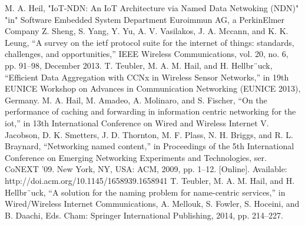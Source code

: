 \documentclass[conference]{IEEEtran}
\begin{document}
  \begin{thebibliography}{00}
  M. A. Heil, "IoT-NDN: An IoT Architecture via Named Data
  Netwoking (NDN)" "in" Software Embedded System Department
  Euroimmun AG, a PerkinElmer Company
   Z. Sheng, S. Yang, Y. Yu, A. V. Vasilakos, J. A. Mccann, and K. K.
  Leung, “A survey on the ietf protocol suite for the internet of things:
  standards, challenges, and opportunities,” IEEE Wireless Communications,
  vol. 20, no. 6, pp. 91–98, December 2013.
   T. Teubler, M. A. M. Hail, and H. Hellbr¨uck, “Efficient Data Aggregation
  with CCNx in Wireless Sensor Networks,” in 19th EUNICE Workshop
  on Advances in Communication Networking (EUNICE 2013), Germany.
  M. A. Hail, M. Amadeo, A. Molinaro, and S. Fischer, “On the performance
  of caching and forwarding in information centric networking for
  the iot,” in 13th International Conference on Wired and Wireless Internet
  V. Jacobson, D. K. Smetters, J. D. Thornton, M. F. Plass, N. H. Briggs,
  and R. L. Braynard, “Networking named content,” in Proceedings of the
  5th International Conference on Emerging Networking Experiments and
  Technologies, ser. CoNEXT ’09. New York, NY, USA: ACM, 2009, pp.
  1–12. [Online]. Available: http://doi.acm.org/10.1145/1658939.1658941
  T. Teubler, M. A. M. Hail, and H. Hellbr¨uck, “A solution for the
  naming problem for name-centric services,” in Wired/Wireless Internet
  Communications, A. Mellouk, S. Fowler, S. Hoceini, and B. Daachi,
  Eds. Cham: Springer International Publishing, 2014, pp. 214–227.
  \end{thebibliography}
  
\end{document}

